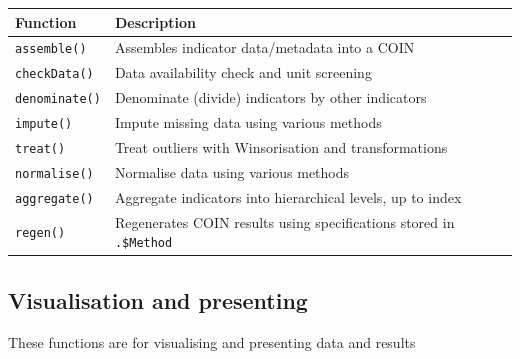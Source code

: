 \documentclass[
]{book}
\begin{document}
\begin{longtable}[]{@{}ll@{}}
\toprule
Function & Description \\
\midrule
\endhead
\texttt{assemble()} & Assembles indicator data/metadata into a COIN \\
\texttt{checkData()} & Data availability check and unit screening \\
\texttt{denominate()} & Denominate (divide) indicators by other indicators \\
\texttt{impute()} & Impute missing data using various methods \\
\texttt{treat()} & Treat outliers with Winsorisation and transformations \\
\texttt{normalise()} & Normalise data using various methods \\
\texttt{aggregate()} & Aggregate indicators into hierarchical levels, up to index \\
\texttt{regen()} & Regenerates COIN results using specifications stored in \texttt{.\$Method} \\
\bottomrule
\end{longtable}

\hypertarget{visualisation-and-presenting}{%
\subsection{Visualisation and presenting}\label{visualisation-and-presenting}}

These functions are for visualising and presenting data and results
\end{document}
